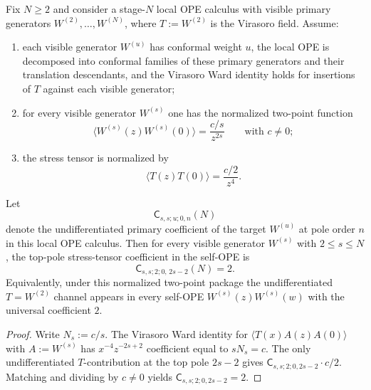 \begin{proposition}
\label{prop:winfty-formal-self-t-coefficient}
Fix $N \ge 2$ and consider a stage-$N$ local OPE calculus with visible
primary generators $W^{(2)},\dots,W^{(N)}$, where
$T:=W^{(2)}$ is the Virasoro field.  Assume:
\begin{enumerate}[label=\textup{(\roman*)}]
\item each visible generator $W^{(u)}$ has conformal weight $u$, the
  local OPE is decomposed into conformal families of these primary
  generators and their translation descendants, and the Virasoro Ward
  identity holds for insertions of $T$ against each visible generator;
\item for every visible generator $W^{(s)}$ one has the normalized
  two-point function
  \[
  \langle W^{(s)}(z)W^{(s)}(0)\rangle=\frac{c/s}{z^{2s}}
  \qquad\text{with } c\neq 0;
  \]
\item the stress tensor is normalized by
  \[
  \langle T(z)T(0)\rangle=\frac{c/2}{z^4}.
  \]
\end{enumerate}
Let
\[
\mathsf{C}_{s,s;u;0,n}(N)
\]
denote the undifferentiated primary coefficient of the target
$W^{(u)}$ at pole order $n$ in this local OPE calculus.  Then for every
visible generator $W^{(s)}$ with $2 \le s \le N$, the top-pole
stress-tensor coefficient in the self-OPE is
\[
\mathsf{C}_{s,s;2;0,\,2s-2}(N)=2.
\]
Equivalently, under this normalized two-point package the
undifferentiated $T=W^{(2)}$ channel appears in every self-OPE
$W^{(s)}(z)W^{(s)}(w)$ with the universal coefficient $2$.
\end{proposition}

\begin{proof}
Write $N_s:=c/s$.  The Virasoro Ward identity for $\langle T(x)A(z)A(0)\rangle$ with $A:=W^{(s)}$ has $x^{-4}z^{-2s+2}$ coefficient equal to $sN_s=c$.  The only undifferentiated $T$-contribution at the top pole $2s-2$ gives $\mathsf{C}_{s,s;2;0,2s-2}\cdot c/2$.  Matching and dividing by $c\neq 0$ yields $\mathsf{C}_{s,s;2;0,2s-2}=2$.
\end{proof}

